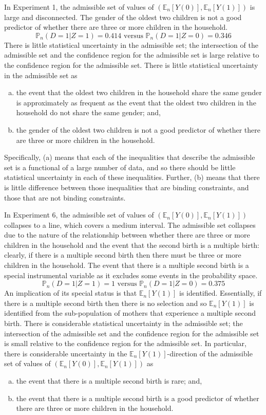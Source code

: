 \documentclass[10pt,a4paper,twoside]{article}
\numberwithin{equation}{section}
\begin{document}
In Experiment 1, the admissible set of values of $(\mathbb{E}_n[Y(0)],\mathbb{E}_n[Y(1)])$ is large and disconnected. The gender of the oldest two children is not a good predictor of whether there are three or more children in the household. 
\[\mathbb{P}_n(D=1|Z=1)=0.414\text{ versus }\mathbb{P}_n(D=1|Z=0)=0.346\]
There is little statistical uncertainty in the admissible set; the intersection of the admissible set and the confidence region for the admissible set is large relative to the confidence region for the admissible set. There is little statistical uncertainty in the admissible set as
\begin{enumerate}[(a)]
\item the event that the oldest two children in the household share the same gender is approximately as frequent as the event that the oldest two children in the household do not share the same gender; and,
\item the gender of the oldest two children is not a good predictor of whether there are three or more children in the household.
\end{enumerate} 
Specifically, (a) means that each of the inequalities that describe the admissible set is a functional of a large number of data, and so there should be little statistical uncertainty in each of these inequalities. Further, (b) means that there is little difference between those inequalities that are binding constraints, and those that are not binding constraints. 

In Experiment 6, the admissible set of values of $(\mathbb{E}_n[Y(0)],\mathbb{E}_n[Y(1)])$ collapses to a line, which covers a medium interval. The admissible set collapses due to the nature of the relationship between whether there are three or more children in the household and the event that the second birth is a multiple birth: clearly, if there is a multiple second birth then there must be three or more children in the household. The event that there is a multiple second birth is a special instrumental variable as it excludes some events in the probability space.
\[\mathbb{P}_n(D=1|Z=1)=1\text{ versus }\mathbb{P}_n(D=1|Z=0)=0.375\]
An implication of its special status is that $\mathbb{E}_n[Y(1)]$ is identified. Essentially, if there is a multiple second birth then there is no selection and so $\mathbb{E}_n[Y(1)]$ is identified from the sub-population of mothers that experience a multiple second birth. There is considerable statistical uncertainty in the admissible set; the intersection of the admissible set and the confidence region for the admissible set is small relative to the confidence region for the admissible set. In particular, there is considerable uncertainty in the $\mathbb{E}_n[Y(1)]$-direction of the admissible set of values of $(\mathbb{E}_n[Y(0)],\mathbb{E}_n[Y(1)])$ as
\begin{enumerate}[(a)]
\item the event that there is a multiple second birth is rare; and,
\item the event that there is a multiple second birth is a good predictor of whether there are three or more children in the household.
\end{enumerate}  
\end{document}
